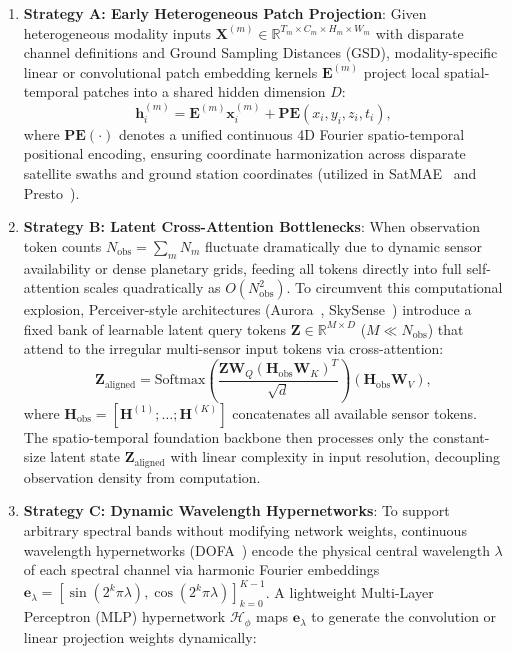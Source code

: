 \begin{enumerate}
    \item \textbf{Strategy A: Early Heterogeneous Patch Projection}: Given heterogeneous modality inputs $\mathbf{X}^{(m)} \in \mathbb{R}^{T_m \times C_m \times H_m \times W_m}$ with disparate channel definitions and Ground Sampling Distances (GSD), modality-specific linear or convolutional patch embedding kernels $\mathbf{E}^{(m)}$ project local spatial-temporal patches into a shared hidden dimension $D$:
    \begin{equation}
        \mathbf{h}_i^{(m)} = \mathbf{E}^{(m)} \mathbf{x}_i^{(m)} + \mathbf{PE}(x_i, y_i, z_i, t_i),
    \end{equation}
    where $\mathbf{PE}(\cdot)$ denotes a unified continuous 4D Fourier spatio-temporal positional encoding, ensuring coordinate harmonization across disparate satellite swaths and ground station coordinates (utilized in SatMAE~\cite{cong2022satmae} and Presto~\cite{tseng2023presto}).
    \item \textbf{Strategy B: Latent Cross-Attention Bottlenecks}: When observation token counts $N_{\text{obs}} = \sum_m N_m$ fluctuate dramatically due to dynamic sensor availability or dense planetary grids, feeding all tokens directly into full self-attention scales quadratically as $O(N_{\text{obs}}^2)$. To circumvent this computational explosion, Perceiver-style architectures (Aurora~\cite{bodnar2024aurora}, SkySense~\cite{guo2024skysense}) introduce a fixed bank of learnable latent query tokens $\mathbf{Z} \in \mathbb{R}^{M \times D}$ ($M \ll N_{\text{obs}}$) that attend to the irregular multi-sensor input tokens via cross-attention:
    \begin{equation}
        \mathbf{Z}_{\text{aligned}} = \text{Softmax}\left(\frac{\mathbf{Z} \mathbf{W}_Q (\mathbf{H}_{\text{obs}} \mathbf{W}_K)^T}{\sqrt{d}}\right) (\mathbf{H}_{\text{obs}} \mathbf{W}_V),
    \end{equation}
    where $\mathbf{H}_{\text{obs}} = [\mathbf{H}^{(1)}; \dots; \mathbf{H}^{(K)}]$ concatenates all available sensor tokens. The spatio-temporal foundation backbone then processes only the constant-size latent state $\mathbf{Z}_{\text{aligned}}$ with linear complexity in input resolution, decoupling observation density from computation.
    \item \textbf{Strategy C: Dynamic Wavelength Hypernetworks}: To support arbitrary spectral bands without modifying network weights, continuous wavelength hypernetworks (DOFA~\cite{xiong2024dofa}) encode the physical central wavelength $\lambda$ of each spectral channel via harmonic Fourier embeddings $\mathbf{e}_\lambda = [\sin(2^k \pi \lambda), \cos(2^k \pi \lambda)]_{k=0}^{K-1}$. A lightweight Multi-Layer Perceptron (MLP) hypernetwork $\mathcal{H}_\phi$ maps $\mathbf{e}_\lambda$ to generate the convolution or linear projection weights dynamically:

\end{enumerate}
